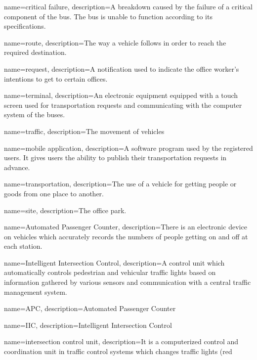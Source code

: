 {%
	name={critical failure},
	description={A breakdown caused by the failure of a critical component of the bus. The bus is unable to function according to its specifications.}
}

{%
	name={route},
	description={The way a vehicle follows in order to reach the required destination.}
}

{%
	name={request},
	description={A notification used to indicate the office worker's intentions to get to certain offices.}
}

{%
	name={terminal},
	description={An electronic equipment equipped with a touch screen used for transportation requests and communicating with the computer system of the buses.}
}

{%
	name={traffic},
	description={The movement of vehicles}
}

{%
	name={mobile application},
	description={A software program used by the registered users. It gives users the ability to publish their transportation requests in advance.}
}

{%
	name={transportation},
	description={The use of a vehicle for getting people or goods from one place to another.}
}

{%
	name={site},
	description={The office park.}
}

{%
	name={Automated Passenger Counter},
	description={There is an electronic device on vehicles which accurately records the numbers of people getting on and off at each station.}
}

{%
	name={Intelligent Intersection Control},
	description={A control unit which automatically controls pedestrian and vehicular traffic lights based on information gathered by various sensors and communication with a central traffic management system.}
}

{%
	name={APC},
	description={Automated Passenger Counter}
}

{%
	name={IIC},
	description={Intelligent Intersection Control}
}

{%
	name={intersection control unit},
	description={It is a computerized control and coordination unit in traffic control systems which changes traffic lights (red}
}

